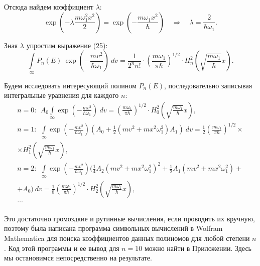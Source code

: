 \documentclass[a4paper,14pt]{article}
\begin{document}
Отсюда найдем коэффициент $\lambda$:
\begin{equation}
\exp\left(-\lambda \frac{m \omega_1^2 x^2}{2}\right)= \exp\left(-\frac{m \omega_1 x^2}{\hbar}\right) \quad \Rightarrow \quad\lambda = \frac{2}{\hbar \omega_1}.
\end{equation}

Зная $\lambda$ упростим выражение (25):
\begin{equation}
\int\limits_{\infty} P_n(E) ~ \exp \left(-\frac{mv^2}{\hbar \omega_1}\right)  ~ dv = \frac{1} {{2^n n!}} \cdot \left({\frac{m \omega_1}{\pi \hbar}}\right)^{1/2} \cdot H_n^2\left(\sqrt{\frac{m \omega_1}{\hbar}}x\right).
\end{equation}

Будем исследовать интересующий полином $P_n(E)$, последовательно записывая интегральные уравнения для каждого $n$:
$$
\begin{array}{l}
n=0: ~~A_0 \int\limits_{\infty}  \exp \left(-\frac{mv^2}{\hbar \omega_1}\right)  ~ dv =  \left({\frac{m \omega_1}{\pi \hbar}}\right)^{1/2} \cdot H_0^2\left(\sqrt{\frac{m \omega_1}{\hbar}}x\right),\\
n=1: ~~\int\limits_{\infty}  \exp \left(-\frac{mv^2}{\hbar \omega_1}\right) \left(A_0 + \frac{1}{2}(m v^2+m x^2 \omega_1^2) A_1\right) ~ dv = \frac{1}{2} \left({\frac{m \omega_1}{\pi \hbar}}\right)^{1/2} \times \\ \times H_1^2\left(\sqrt{\frac{m \omega_1}{\hbar}}x\right), \\
n=2: ~~\int\limits_{\infty}  \exp\left({-\frac{m v^2}{\hbar \omega_1 }}\right) (\frac{1}{4} A_2 \left(m v^2+m x^2 \omega_1 ^2\right)^2+\frac{1}{2} A_1 \left(m v^2+m x^2 \omega_1 ^2\right) + \\ +  A_0) ~ dv = \frac{1}{8} \left({\frac{m \omega_1}{\pi \hbar}}\right)^{1/2} \cdot H_2^2\left(\sqrt{\frac{m \omega_1}{\hbar}}x\right),\\
\ldots\\
\end{array}
$$

Это достаточно громоздкие и рутинные вычисления, если проводить их вручную, поэтому была написана программа символьных вычислений в Wolfram Mathematica для поиска коэффициентов данных полиномов для любой степени $n$. Код этой программы и ее вывод для $n=10$ можно найти в Приложении. Здесь мы остановимся непосредственно на результате.
\end{document}
